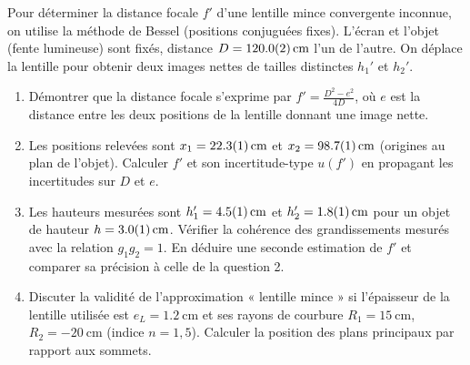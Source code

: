 \documentclass[11pt]{article}
\begin{document}
\begin{exercice}
Pour déterminer la distance focale $f'$ d'une lentille mince convergente inconnue, on utilise la méthode de Bessel (positions conjuguées fixes). L'écran et l'objet (fente lumineuse) sont fixés, distance $D = \SI{120,0 \pm 0,2}{\centi\metre}$ l'un de l'autre. On déplace la lentille pour obtenir deux images nettes de tailles distinctes $h_1'$ et $h_2'$.
\begin{enumerate}
    \item Démontrer que la distance focale s'exprime par $f' = \frac{D^2 - e^2}{4D}$, où $e$ est la distance entre les deux positions de la lentille donnant une image nette.
    \item Les positions relevées sont $x_1 = \SI{22,3 \pm 0,1}{\centi\metre}$ et $x_2 = \SI{98,7 \pm 0,1}{\centi\metre}$ (origines au plan de l'objet). Calculer $f'$ et son incertitude-type $u(f')$ en propagant les incertitudes sur $D$ et $e$.
    \item Les hauteurs mesurées sont $h_1' = \SI{4,5 \pm 0,1}{\centi\metre}$ et $h_2' = \SI{1,8 \pm 0,1}{\centi\metre}$ pour un objet de hauteur $h = \SI{3,0 \pm 0,1}{\centi\metre}$. Vérifier la cohérence des grandissements mesurés avec la relation $g_1 g_2 = 1$. En déduire une seconde estimation de $f'$ et comparer sa précision à celle de la question 2.
    \item Discuter la validité de l'approximation « lentille mince » si l'épaisseur de la lentille utilisée est $e_L = \SI{1,2}{\centi\metre}$ et ses rayons de courbure $R_1 = \SI{15}{\centi\metre}$, $R_2 = -\SI{20}{\centi\metre}$ (indice $n=1,5$). Calculer la position des plans principaux par rapport aux sommets.
\end{enumerate}
\end{exercice}
\end{document}
